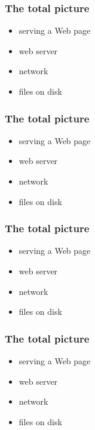 \begin{frame}
  \frametitle{The total picture}
  \begin{itemize}
  \item serving a Web page
  \item web server
  \item network 
  \item files on disk
  \end{itemize}
\end{frame}

\begin{frame}
  \frametitle{The total picture}
  \begin{itemize}
  \item serving a Web page
  \item web server
  \item network 
  \item files on disk
  \end{itemize}
\end{frame}

\begin{frame}
  \frametitle{The total picture}
  \begin{itemize}
  \item serving a Web page
  \item web server
  \item network 
  \item files on disk
  \end{itemize}
\end{frame}

\begin{frame}
  \frametitle{The total picture}
  \begin{itemize}
  \item serving a Web page
  \item web server
  \item network 
  \item files on disk
  \end{itemize}
\end{frame}



